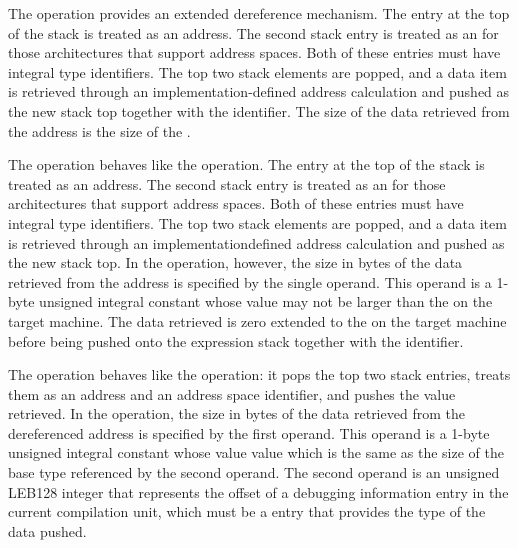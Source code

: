 \begin{enumerate}[1. ]
\itembfnl{\DWOPxderefTARG}
The \DWOPxderefNAME{} operation provides an extended dereference
mechanism. The entry at the top of the stack is treated as an
address. The second stack entry is treated as an  for those architectures that support
address spaces.
Both of these entries must have integral type identifiers.
The top two stack elements are popped,
and a data item is retrieved through an implementation-defined
address calculation and pushed as the new stack top together with the
\generictype{} identifier.
The size of the data retrieved from the
address is the size of the \generictype.

\itembfnl{\DWOPxderefsizeTARG}
The \DWOPxderefsizeNAME{} operation behaves like the
\DWOPxderef{} operation. The entry at the top of the stack is
treated as an address. The second stack entry is treated as
an  for those architectures
that support
address spaces.
Both of these entries must have integral type identifiers.
The top two stack
elements are popped, and a data item is retrieved through an
implementation\dash defined address calculation and pushed as the
new stack top. In the \DWOPxderefsizeNAME{} operation, however,
the size in bytes of the data retrieved from the
address is specified by the single operand. This operand is a
1-byte unsigned integral constant whose value may not be larger
than the  on the target machine. The data
retrieved is zero extended to the  on the
target machine before being pushed onto the expression stack together
with the \generictype{} identifier.

\itembfnl{\DWOPxdereftypeTARG}
The \DWOPxdereftypeNAME{} operation behaves like the \DWOPxderefsize{}
operation: it pops the top two stack entries, treats them as an address and
an address space identifier, and pushes the value retrieved. In the
\DWOPxdereftypeNAME{} operation, the size in bytes of the data retrieved from
the dereferenced address is specified by the first operand. This operand is
a 1-byte unsigned integral constant whose value
value which is the same as the size of the base type referenced
by the second operand. The second
operand is an unsigned LEB128 integer that represents the offset of a
debugging information entry in the current compilation unit, which must be a
\DWTAGbasetype{} entry that provides the type of the data pushed.


\end{enumerate}
